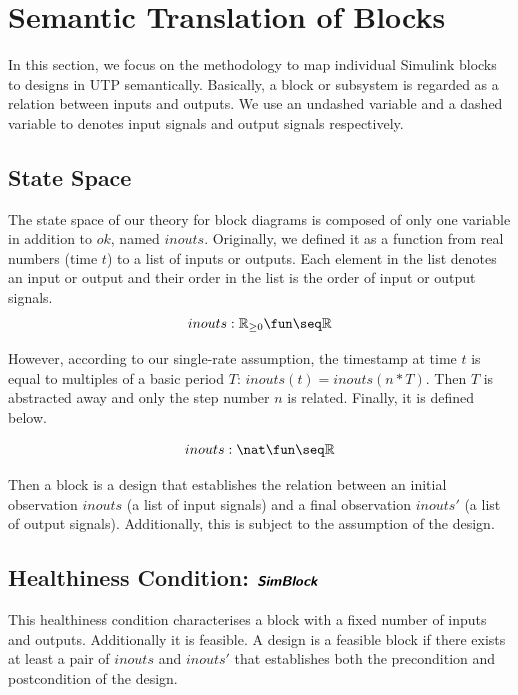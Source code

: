 \section{Semantic Translation of Blocks}
\label{sec:trans}

In this section, we focus on the methodology to map individual Simulink blocks to designs in UTP semantically. Basically, a block or subsystem is regarded as a relation between inputs and outputs. We use an undashed variable and a dashed variable to denotes input signals and output signals respectively.

\subsection{State Space}
The state space of our theory for block diagrams is composed of only one variable in addition to $ok$, named $inouts$. Originally, we defined it as a function from real numbers (time $t$) to a list of inputs or outputs. Each element in the list denotes an input or output and their order in the list is the order of input or output signals.
\begin{align*}
    inouts: \real_{\geq 0}\fun \seq \real
\end{align*}

However, according to our single-rate assumption, the timestamp at time $t$ is equal to multiples of a basic period $T$: $inouts(t) = inouts(n*T)$. Then $T$ is abstracted away and only the step number $n$ is related. Finally, it is defined below.

\begin{align*}
    inouts : \nat \fun \seq \real
\end{align*}

Then a block is a design that establishes the relation between an initial observation $inouts$ (a list of input signals) and a final observation $inouts'$ (a list of output signals). Additionally, this is subject to the assumption of the design.

\subsection{Healthiness Condition: $\hbox{\textbf{\textsf{\textsl{SimBlock}}}}$}
This healthiness condition characterises a block with a fixed number of inputs and outputs. Additionally it is feasible. A design is a feasible block if there exists at least a pair of $inouts$ and $inouts'$ that establishes both the precondition and postcondition of the design.


